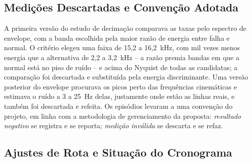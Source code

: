 \documentclass[12pt,a4paper]{article}
\begin{document}
\subsection{Medições Descartadas e Convenção Adotada}
\label{sec:descartadas}

A primeira versão do estudo de decimação comparava as taxas pelo espectro de envelope, com a banda escolhida pela maior razão de energia entre falha e normal. O critério elegeu uma faixa de 15,2 a 16,2~kHz, com mil vezes menos energia que a alternativa de 2,2 a 3,2~kHz -- a razão premia bandas em que a normal está no piso de ruído -- e acima do Nyquist de todas as candidatas; a comparação foi descartada e substituída pela energia discriminante. Uma versão posterior do envelope procurava os picos perto das frequências cinemáticas e estimava o ruído a 3 a 25~Hz delas, justamente onde estão as linhas reais, e também foi descartada e refeita. Os episódios levaram a uma convenção do projeto, em linha com a metodologia de gerenciamento da proposta: \emph{resultado negativo} se registra e se reporta; \emph{medição inválida} se descarta e se refaz.

\subsection{Ajustes de Rota e Situação do Cronograma}
\label{sec:ajustes}
\end{document}
